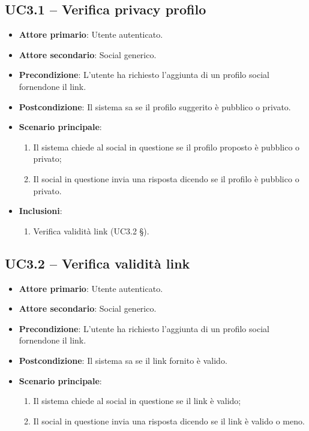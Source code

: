 \subsection{UC3.1 – Verifica privacy profilo}
\begin{itemize}
    \item \textbf{Attore primario}: Utente autenticato.
    \item \textbf{Attore secondario}: Social generico.
    \item \textbf{Precondizione}: L’utente ha richiesto l’aggiunta di un profilo social fornendone il link.
    \item \textbf{Postcondizione}: Il sistema sa se il profilo suggerito è pubblico o privato.

    \item \textbf{Scenario principale}: 
    \begin{enumerate}
        \item Il sistema chiede al social in questione se il profilo proposto è pubblico o privato;
        \item Il social in questione invia una risposta dicendo se il profilo è pubblico o privato.
    \end{enumerate}

    \item \textbf{Inclusioni}:
    \begin{enumerate}
        \item Verifica validità link (UC3.2 §).
    \end{enumerate}
\end{itemize}

\subsection{UC3.2 – Verifica validità link}
\begin{itemize}
    \item \textbf{Attore primario}: Utente autenticato.
    \item \textbf{Attore secondario}: Social generico.
    \item \textbf{Precondizione}: L’utente ha richiesto l’aggiunta di un profilo social fornendone il link.
    \item \textbf{Postcondizione}: Il sistema sa se il link fornito è valido.

    \item \textbf{Scenario principale}: 
    \begin{enumerate}
        \item Il sistema chiede al social in questione se il link è valido;
        \item Il social in questione invia una risposta dicendo se il link è valido o meno.
    \end{enumerate}
\end{itemize}

